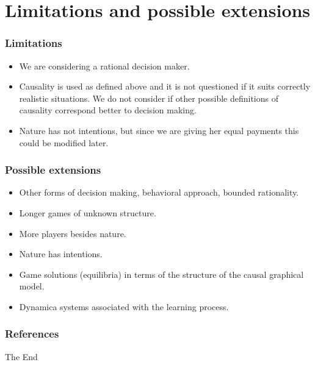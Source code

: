 \documentclass{beamer}
\theoremstyle{plain}
\begin{document}
\section{Limitations and possible extensions}
\begin{frame}
\frametitle{Limitations}
\begin{itemize}
\item We are considering a rational decision maker.

\item Causality is used as defined above and it is not questioned if it suits correctly realistic situations. We do not consider if other possible definitions of causality correspond better to decision making.

\item Nature has not intentions, but since we are giving her equal payments this could be modified later.
\end{itemize}
\end{frame}

\begin{frame}
\frametitle{Possible extensions}
\begin{itemize}
\item Other forms of decision making, behavioral approach, bounded rationality.
\item Longer games of unknown structure.
\item More players besides nature.
\item Nature has intentions.
\item Game solutions (equilibria) in terms of the structure of the causal graphical model.
\item Dynamica systems associated with the learning process.
\end{itemize}
\end{frame}


\begin{frame}[allowframebreaks]
\frametitle{References}


\end{frame}


\begin{frame}
\Huge{\centerline{The End}}
\end{frame}

\end{document}
